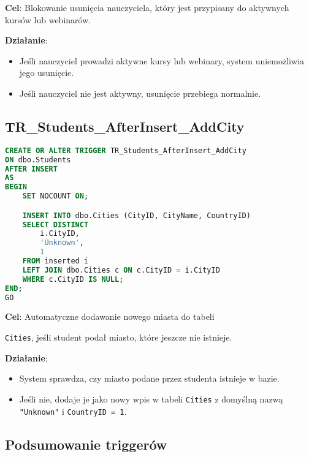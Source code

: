 \documentclass[12pt]{article}
\begin{document}
\noindent \textbf{Cel}: Blokowanie usunięcia nauczyciela, który jest przypisany do aktywnych kursów lub webinarów.  

\noindent \textbf{Działanie}:  
\begin{itemize}
    \item Jeśli nauczyciel prowadzi aktywne kursy lub webinary, system uniemożliwia jego usunięcie.
    \item Jeśli nauczyciel nie jest aktywny, usunięcie przebiega normalnie.
\end{itemize}

\vspace{1em}

\newpage

\subsection{TR\_Students\_AfterInsert\_AddCity}
\begin{lstlisting}[language=SQL]
CREATE OR ALTER TRIGGER TR_Students_AfterInsert_AddCity
ON dbo.Students
AFTER INSERT
AS
BEGIN
    SET NOCOUNT ON;

    INSERT INTO dbo.Cities (CityID, CityName, CountryID)
    SELECT DISTINCT
        i.CityID,
        'Unknown',  
        1           
    FROM inserted i
    LEFT JOIN dbo.Cities c ON c.CityID = i.CityID
    WHERE c.CityID IS NULL;
END;
GO
\end{lstlisting}

\noindent \textbf{Cel}: Automatyczne dodawanie nowego miasta do tabeli 

\noindent \texttt{Cities}, jeśli student podał miasto, które jeszcze nie istnieje.  

\noindent \textbf{Działanie}:  
\begin{itemize}
    \item System sprawdza, czy miasto podane przez studenta istnieje w bazie.
    \item Jeśli nie, dodaje je jako nowy wpis w tabeli \texttt{Cities} z domyślną nazwą \texttt{"Unknown"} i \texttt{CountryID = 1}.
\end{itemize}

\vspace{1em}

\subsection*{Podsumowanie triggerów}
\vspace{1em}
\end{document}
